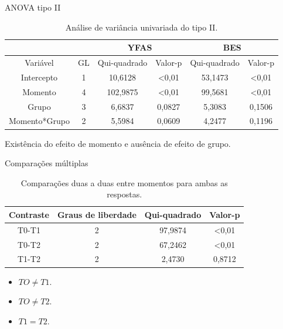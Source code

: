 \documentclass[
  ignorenonframetext,
  serif,
  professionalfont,
  usenames,
  dvipsnames,
  aspectratio = 169]{beamer}
\begin{document}
\begin{frame}{ANOVA tipo II}
\protect\hypertarget{anova-tipo-ii}{}
\begin{table}[H]
\centering
\begin{tabular}{c|c|cc|cc}
\hline
              &                    & \multicolumn{2}{c|}{YFAS}     & \multicolumn{2}{c}{BES}       \\ \hline
Variável      & GL & Qui-quadrado & Valor-p        & Qui-quadrado & Valor-p        \\ \hline
Intercepto    & 1                  & 10,6128      & \textless 0,01 & 53,1473      & \textless 0,01 \\
Momento       & 4                  & 102,9875     & \textless 0,01 & 99,5681      & \textless 0,01 \\
Grupo         & 3                  & 6,6837       & 0,0827         & 5,3083       & 0,1506         \\
Momento*Grupo & 2                  & 5,5984       & 0,0609         & 4,2477       & 0,1196         \\ \hline
\end{tabular}
\caption{Análise de variância univariada do tipo II.}
\label{tab:anovaII}
\end{table}

Existência do efeito de momento e ausência de efeito de grupo.
\end{frame}

\begin{frame}{Comparações múltiplas}
\protect\hypertarget{comparauxe7uxf5es-muxfaltiplas}{}
\begin{table}[H]
\centering
\begin{tabular}{cccc}
\hline
Contraste & Graus de liberdade & Qui-quadrado & Valor-p        \\ \hline
T0-T1     & 2                  & 97,9874      & \textless 0,01 \\
T0-T2     & 2                  & 67,2462      & \textless 0,01 \\
T1-T2     & 2                  & 2,4730       & 0,8712         \\ \hline
\end{tabular}
\caption{Comparações duas a duas entre momentos para ambas as respostas.}
\label{tab:mul-multcomp1}
\end{table}

\begin{itemize}
  \item $TO \neq T1$.
  \item $TO \neq T2$.
  \item $T1 = T2$.
\end{itemize}
\end{frame}
\end{document}
